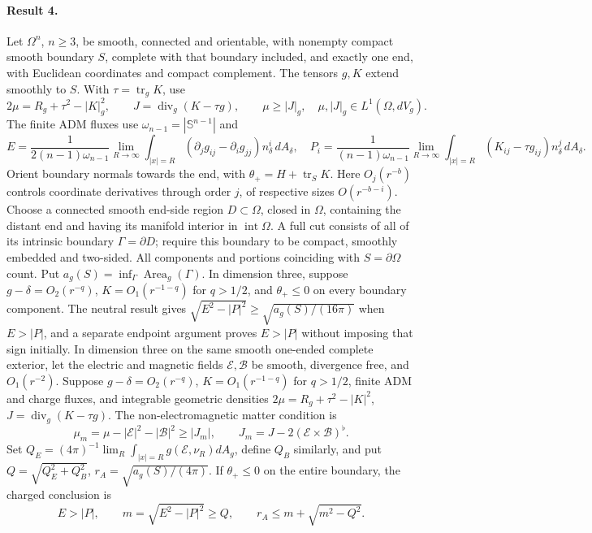 \documentclass[11pt]{article}
\begin{document}
\paragraph{Result 4.} Let $\Omega^n$, $n\ge3$, be smooth, connected and orientable, with nonempty compact smooth boundary $S$, complete with that boundary included, and exactly one end, with Euclidean coordinates and compact complement. The tensors $g,K$ extend smoothly to $S$. With $\tau=\operatorname{tr}_gK$, use
\[
 2\mu=R_g+\tau^2-|K|_g^2,\qquad J=\operatorname{div}_g(K-\tau g),\qquad
 \mu\ge|J|_g,\quad\mu,|J|_g\in L^1(\Omega,dV_g).
\]
The finite ADM fluxes use $\omega_{n-1}=|\mathbb S^{n-1}|$ and
\[
 E=\frac1{2(n-1)\omega_{n-1}}\lim_{R\to\infty}\int_{|x|=R}
 (\partial_jg_{ij}-\partial_ig_{jj})n_\delta^i\,dA_\delta,\quad
 P_i=\frac1{(n-1)\omega_{n-1}}\lim_{R\to\infty}\int_{|x|=R}(K_{ij}-\tau g_{ij})n_\delta^j\,dA_\delta.
\]
Orient boundary normals towards the end, with $\theta_+=H+\operatorname{tr}_SK$. Here $O_j(r^{-b})$ controls coordinate derivatives through order $j$, of respective sizes $O(r^{-b-i})$. Choose a connected smooth end-side region $D\subset\Omega$, closed in $\Omega$, containing the distant end and having its manifold interior in $\operatorname{int}\Omega$. A full cut consists of all of its intrinsic boundary $\Gamma=\partial D$; require this boundary to be compact, smoothly embedded and two-sided. All components and portions coinciding with $S=\partial\Omega$ count. Put $a_g(S)=\inf_\Gamma\operatorname{Area}_g(\Gamma)$. In dimension three, suppose $g-\delta=O_2(r^{-q})$, $K=O_1(r^{-1-q})$ for $q>1/2$, and $\theta_+\le0$ on every boundary component. The neutral result gives $\sqrt{E^2-|P|^2}\ge\sqrt{a_g(S)/(16\pi)}$ when $E>|P|$, and a separate endpoint argument proves $E>|P|$ without imposing that sign initially. In dimension three on the same smooth one-ended complete exterior, let the electric and magnetic fields $\mathcal E,\mathcal B$ be smooth, divergence free, and $O_1(r^{-2})$. Suppose $g-\delta=O_2(r^{-q})$, $K=O_1(r^{-1-q})$ for $q>1/2$, finite ADM and charge fluxes, and integrable geometric densities $2\mu=R_g+\tau^2-|K|^2$, $J=\operatorname{div}_g(K-\tau g)$. The non-electromagnetic matter condition is
\[
 \mu_m=\mu-|\mathcal E|^2-|\mathcal B|^2\ge|J_m|,\qquad
 J_m=J-2(\mathcal E\times\mathcal B)^\flat.
\]
Set $Q_E=(4\pi)^{-1}\lim_R\int_{|x|=R}g(\mathcal E,\nu_R)dA_g$, define $Q_B$ similarly, and put $Q=\sqrt{Q_E^2+Q_B^2}$, $r_A=\sqrt{a_g(S)/(4\pi)}$. If $\theta_+\le0$ on the entire boundary, the charged conclusion is
\[
 E>|P|,\qquad m=\sqrt{E^2-|P|^2}\ge Q,\qquad
 r_A\le m+\sqrt{m^2-Q^2}.
\]
\end{document}

